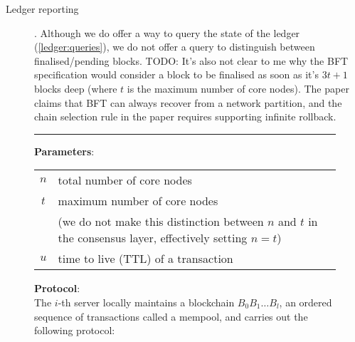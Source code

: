 \begin{description}
  \item[Ledger reporting].
  Although we do offer a way to query the state of the ledger
  (\cref{ledger:queries}), we do not offer a query to distinguish between
  finalised/pending blocks.
   TODO: It's also not clear to me why the BFT specification would
  consider a block to be finalised as soon as it's $3t + 1$ blocks deep
  (where $t$ is the maximum number of core nodes). The paper claims that BFT
  can always recover from a network partition, and the chain selection rule
  in the paper requires supporting infinite rollback.

\end{description}

\begin{figure}
\small
\hrule
\textbf{Parameters}:

\vspace{1em}

\begin{tabular}{c|l}
$n$ & total number of core nodes \\
$t$ & maximum number of core nodes \\
    & (we do not make this distinction between $n$ and $t$ in the consensus layer, effectively setting $n = t$) \\
$u$ & time to live (TTL) of a transaction \\
\end{tabular}

\vspace{1em}

\textbf{Protocol}: \\

The $i$-th server locally maintains a blockchain $B_0 B_1 \ldots B_l$, an
ordered sequence of transactions called a mempool, and carries out the following
protocol:


\end{figure}
